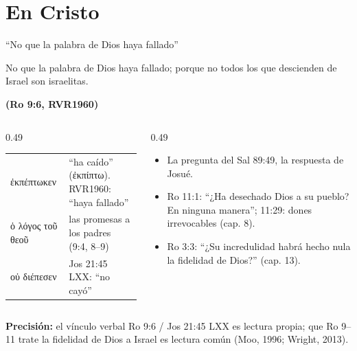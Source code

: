 \documentclass[hyperref={bookmarks=false},aspectratio=169]{beamer}
\newcommand{\grc}[1]{\foreignlanguage{ancientgreek}{#1}}
\newcommand{\fuente}[1]{\par\hfill{\upshape\bfseries\footnotesize\textcolor{azul}{#1}}}
\newcommand{\precision}[1]{{\footnotesize\color{gris}\textbf{Precisión:} #1}}
\begin{document}
\section{En Cristo}

\begin{frame}{``No que la palabra de Dios haya fallado''}
\begin{cita}No que la palabra de Dios haya fallado; porque no todos los que descienden de Israel son israelitas.\fuente{(Ro 9:6, RVR1960)}\end{cita}
\begin{columns}[t,onlytextwidth]
\begin{column}{0.49\textwidth}\scriptsize\renewcommand{\arraystretch}{1.12}
\begin{tabular}{@{}>{\RaggedRight\arraybackslash}p{2.2cm}>{\RaggedRight\arraybackslash}p{3.3cm}@{}}
\toprule
\grc{ἐκπέπτωκεν} & ``ha caído'' (\grc{ἐκπίπτω}). RVR1960: ``haya fallado'' \\
\grc{ὁ λόγος τοῦ θεοῦ} & las promesas a los padres (9:4, 8--9) \\
\grc{οὐ διέπεσεν} & Jos 21:45 LXX: ``no cayó'' \\
\bottomrule
\end{tabular}
\end{column}
\begin{column}{0.49\textwidth}\small
\begin{itemize}
\item La pregunta del Sal 89:49, la respuesta de Josué.
\item Ro 11:1: ``¿Ha desechado Dios a su pueblo? En ninguna manera''; 11:29: dones irrevocables (cap. 8).
\item Ro 3:3: ``¿Su incredulidad habrá hecho nula la fidelidad de Dios?'' (cap. 13).
\end{itemize}
\end{column}
\end{columns}\par\smallskip
\precision{el vínculo verbal Ro 9:6 / Jos 21:45 LXX es lectura propia; que Ro 9--11 trate la fidelidad de Dios a Israel es lectura común (Moo, 1996; Wright, 2013).}
\end{frame}
\end{document}
